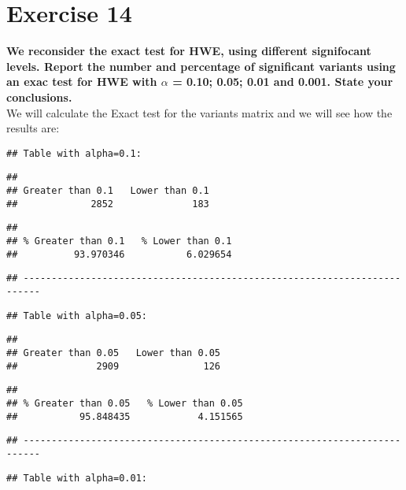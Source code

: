 \documentclass[]{article}
\begin{document}
\section{Exercise 14}\label{exercise-14}

\textbf{We reconsider the exact test for HWE, using different
signifocant levels. Report the number and percentage of significant
variants using an exac test for HWE with \(\alpha\) = 0.10; 0.05; 0.01
and 0.001. State your conclusions.}\\
We will calculate the Exact test for the variants matrix and we will see
how the results are:

\begin{verbatim}
## Table with alpha=0.1:
\end{verbatim}

\begin{verbatim}
## 
## Greater than 0.1   Lower than 0.1 
##             2852              183
\end{verbatim}

\begin{verbatim}
## 
## % Greater than 0.1   % Lower than 0.1 
##          93.970346           6.029654
\end{verbatim}

\begin{verbatim}
## -------------------------------------------------------------------------
\end{verbatim}

\begin{verbatim}
## Table with alpha=0.05:
\end{verbatim}

\begin{verbatim}
## 
## Greater than 0.05   Lower than 0.05 
##              2909               126
\end{verbatim}

\begin{verbatim}
## 
## % Greater than 0.05   % Lower than 0.05 
##           95.848435            4.151565
\end{verbatim}

\begin{verbatim}
## -------------------------------------------------------------------------
\end{verbatim}

\begin{verbatim}
## Table with alpha=0.01:
\end{verbatim}
\end{document}
